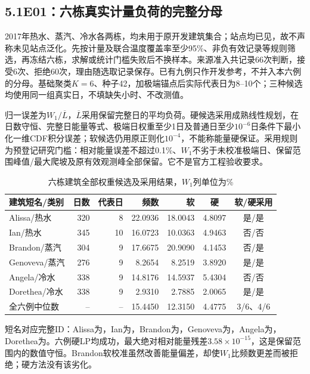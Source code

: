 \subsection*{5.1\quad E01：六栋真实计量负荷的完整分母}
2017年热水、蒸汽、冷水各两栋，均未用于原开发建筑集合；站点均已见，故不声称未见站点泛化。先按计量及联合温度覆盖率至少95\%、非负有效记录等规则筛选，再冻结六栋，求解或统计门槛失败后不换样本。来源准入共记录66次判断，接受6次、拒绝60次，理由随选取记录保存。已有九例只作开发参考，不并入本六例的分母。基础聚类$K=6$、种子42，加极端锚点后实际代表日为8--10个；三种候选均使用同一组真实日，不填缺失小时、不改测值。

归一误差为$W_1/\overline L$，$\overline L$采用保留完整日的平均负荷。硬候选采用成熟线性规划，在日数守恒、完整日能量等式、极端日权重至少1日及普通日至少$10^{-6}$日条件下最小化一维CDF积分误差；软候选仍用原正则化$10^{-4}$，不能称能量硬保证。采用规则为预登记研究门槛：相对能量误差不超过0.1\%、$W_1$不劣于未校准极端日、保留范围峰值/最大爬坡及原有效观测峰全部保留。它不是官方工程验收要求。

\begin{table}[H]
\centering
\caption{六栋建筑全部权重候选及采用结果，$W_1$列单位为\%}\label{tab:r8p-bdg2-all}
\begin{tabularx}{\linewidth}{@{}Yrrrrcc@{}}
\toprule
建筑短名/类别 & 日数 & 代表日 & 频数 & 软 & 硬 & 软/硬采用\\\midrule
Alissa/热水 & 320 & 8 & 22.0936 & 18.0043 & 4.8097 & 是/是\\
Ian/热水 & 345 & 10 & 16.0723 & 10.0363 & 4.9463 & 否/否\\
Brandon/蒸汽 & 304 & 9 & 17.6675 & 20.9090 & 4.1453 & 否/是\\
Genoveva/蒸汽 & 276 & 9 & 8.2654 & 8.2519 & 3.8920 & 是/是\\
Angela/冷水 & 338 & 9 & 14.8176 & 14.5937 & 5.4304 & 否/否\\
Dorethea/冷水 & 338 & 9 & 2.9310 & 2.7885 & 2.0065 & 是/是\\\midrule
全六例中位数 & -- & -- & 15.4450 & 12.3150 & 4.4775 & 3/6、4/6\\
\bottomrule
\end{tabularx}
\end{table}

短名对应完整ID：Alissa为，Ian为，Brandon为，Genoveva为，Angela为，Dorethea为。六例硬LP均成功，最大绝对相对能量残差$3.58\times10^{-15}$，这是保留范围内的数值守恒。Brandon软校准虽然改善能量偏差，却使$W_1$比频数更差而被拒绝；硬方法没有该劣化。

